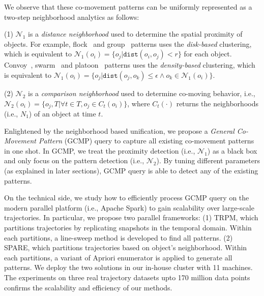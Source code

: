 We observe that these co-movement patterns can be uniformly represented as a two-step neighborhood analytics as follows:
	
	(1) $\mathcal{N}_1$ is a \emph{distance neighborhood} used to determine the spatial proximity of objects. For example,  flock~\cite{gudmundsson2006computing} and group~\cite{wang2006grouppattern} patterns uses the \emph{disk-based} clustering, which is equivalent to $\mathcal{N}_1(o_i)= \{o_j | \mathtt{dist}(o_i,o_j) < r \}$ for each object. Convoy~\cite{jeung2008discovery}, swarm~\cite{li2010swarm} and platoon~\cite{li2015platoon} patterns uses the \emph{density-based} clustering, which is equivalent to $\mathcal{N}_1(o_i)= \{o_j | \mathtt{dist}(o_j,o_k) \leq \epsilon \wedge o_k \in \mathcal{N}_1(o_i)\}$.
	
	(2) $\mathcal{N}_2$ is a \emph{comparison neighborhood} used to determine co-moving behavior, i.e., $\mathcal{N}_2(o_i)=\{o_j, T | \forall t \in T, o_j \in C_t(o_i) \}$, where $C_t(\cdot)$ returns the neighborhoods (i.e., $N_1$) of an object at time $t$.

Enlightened by the neighborhood based unification, we propose a \emph{General Co-Movement Pattern} (GCMP)
query to capture all existing co-movement patterns in one shot. In GCMP, we treat the proximity detection (i.e., $\mathcal{N}_1$) as
a black box and only focus on the pattern detection (i.e., $\mathcal{N}_2$). By tuning different parameters (as explained in later sections), GCMP
query is able to detect any of the existing patterns.
%



On the technical side, we study how to efficiently process GCMP query 
on the modern parallel platform (i.e., Apache Spark) to
gain scalability over large-scale trajectories. 
In particular, we propose two parallel frameworks: (1) TRPM, which partitions trajectories by replicating snapshots in the temporal domain. Within each partitions, a line-sweep method is developed to find all patterns. 
(2) SPARE, which partitions trajectories based on object's neighborhood. Within each partitions, a variant of Apriori enumerator is applied to generate all patterns. 
We deploy the two solutions in our in-house cluster with 11 machines. The experiments on three
real trajectory datasets upto 170 million data points confirms the scalability and efficiency 
of our methods.
%
